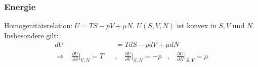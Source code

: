 

\subsubsection{Energie}

Homogenitätsrelation: $U = T S - p V + \mu N$. $U(S,V,N)$ ist konvex in $S,V$
und $N$. Insbesondere gilt:
\begin{align*}
    dU &= T dS - p dV + \mu dN
    \\
    \Rightarrow \hspace{10pt}
    \frac{\partial U}{\partial S} \Big|_{V,N} = T
    \hspace{10pt} &, \hspace{10pt}
    \frac{\partial U}{\partial V} \Big|_{S,N} = -p
    \hspace{10pt} , \hspace{10pt}
    \frac{\partial U}{\partial N} \Big|_{S,V} = \mu
\end{align*}

